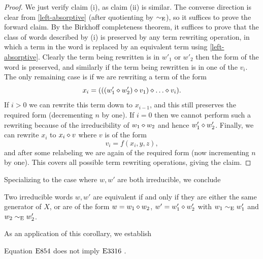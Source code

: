\begin{proof}  We just verify claim (i), as claim (ii) is similar.  The converse direction is clear from \eqref{left-absorptive} (after quotienting by $\sim_{\mathrm{E}}$), so it suffices to prove the forward claim. By the Birkhoff completeness theorem, it suffices to prove that the class of words described by (i) is preserved by any term rewriting operation, in which a term in the word is replaced by an equivalent term using \eqref{left-absorptive}.  Clearly the term being rewritten is in $w'_1$ or $w'_2$ then the form of the word is preserved, and similarly if the term being rewritten is in one of the $v_i$.  The only remaining case is if we are rewriting a term of the form
$$ x_i = (((w'_1 \op w'_2) \op v_1) \op \dots \op v_i).$$
If $i>0$ we can rewrite this term down to $x_{i-1}$, and this still preserves the required form (decrementing $n$ by one).  If $i=0$ then we cannot perform such a rewriting because of the irreducibility of $w_1 \diamond w_2$ and hence $w'_1 \diamond w'_2$.  Finally, we can rewrite $x_i$ to $x_i \diamond v$ where $v$ is of the form
$$ v_i = f(x_i,y,z),$$
and after some relabeling we are again of the required form (now incrementing $n$ by one). This covers all possible term rewriting operations, giving the claim.
\end{proof}

Specializing to the case where $w,w'$ are both irreducible, we conclude

\begin{corollary}\label{unique-factorization}  Two irreducible words $w, w'$ are equivalent if and only if they are either the same generator of $X$, or are of the form $w = w_1 \diamond w_2$, $w' = w'_1 \diamond w'_2$ with $w_1 \sim_{\mathrm{E}} w'_1$ and $w_2 \sim_{\mathrm{E}} w'_2$.
\end{corollary}

As an application of this corollary, we establish

\begin{proposition}[$\Eq{854} \nmodels \Eq{3316}$]\label{854-3316} Equation $\mathrm{E}854$ does not imply $\mathrm{E}3316$ .
\end{proposition}

